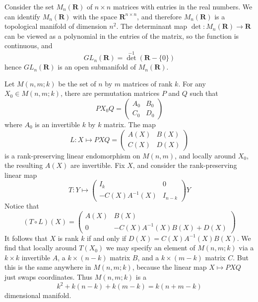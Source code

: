 \begin{example}
    Consider the set $M_n(\mathbf{R})$ of $n \times n$ matrices with entries in the real numbers. We can identify $M_n(\mathbf{R})$ with the space $\mathbf{R}^{n \times n}$, and therefore $M_n(\mathbf{R})$ is a topological manifold of dimension $n^2$. The determinant map $\det:M_n(\mathbf{R}) \to \mathbf{R}$ can be viewed as a polynomial in the entries of the matrix, so the function is continuous, and
    \[ GL_n(\mathbf{R}) = {\det}^{-1}(\mathbf{R} - \{0\}) \]
    hence $GL_n(\mathbf{R})$ is an open submanifold of $M_n(\mathbf{R})$.
\end{example}

\begin{example}
    Let $M(n,m;k)$ be the set of $n$ by $m$ matrices of rank $k$. For any $X_0 \in M(n,m;k)$, there are permutation matrices $P$ and $Q$ such that
    \[ PX_0Q = \begin{pmatrix} A_0 & B_0 \\ C_0 & D_0 \end{pmatrix} \]
    where $A_0$ is an invertible $k$ by $k$ matrix. The map
    \[ L: X \mapsto PXQ = \begin{pmatrix} A(X) & B(X) \\ C(X) & D(X) \end{pmatrix} \]
    is a rank-preserving linear endomorphism on $M(n,m)$, and locally around $X_0$, the resulting $A(X)$ are invertible. Fix $X$, and consider the rank-preserving linear map
    \[ T: Y \mapsto \begin{pmatrix} I_k & 0 \\ -C(X)A^{-1}(X) & I_{n-k} \end{pmatrix} Y \]
    Notice that
    \[ (T \circ L)(X) = \begin{pmatrix} A(X) & B(X) \\ 0 & -C(X)A^{-1}(X)B(X) + D(X) \end{pmatrix} \]
    It follows that $X$ is rank $k$ if and only if $D(X) = C(X)A^{-1}(X)B(X)$. We find that locally around $T(X_0)$ we may specify an element of $M(n,m;k)$ via a $k \times k$ invertible $A$, a $k \times (n - k)$ matrix $B$, and a $k \times (m - k)$ matrix $C$. But this is the same anywhere in $M(n,m;k)$, because the linear map $X \mapsto PXQ$ just swaps coordinates. Thus $M(n,m;k)$ is a
    \[ k^2 + k(n-k) + k(m-k) = k(n + m - k) \]
    dimensional manifold.
\end{example}

